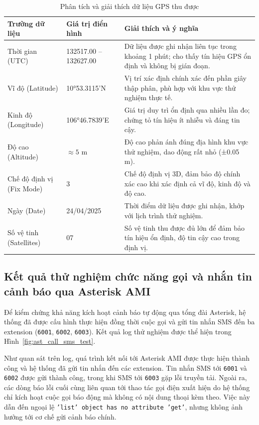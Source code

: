 \begin{table}[H]
\centering
\caption{Phân tích và giải thích dữ liệu GPS thu được}
\label{tab:gps_analysis}
\renewcommand{\arraystretch}{1.3}
\begin{tabularx}{\textwidth}{|p{3cm}|p{3cm}|X|}
\hline
\textbf{Trường dữ liệu} & \textbf{Giá trị điển hình} & \textbf{Giải thích và ý nghĩa} \\
\hline
Thời gian (UTC) & 132517.00 -- 132627.00 & Dữ liệu được ghi nhận liên tục trong khoảng 1 phút; cho thấy tín hiệu GPS ổn định và không bị gián đoạn. \\
\hline
Vĩ độ (Latitude) & 10°53.3115'N & Vị trí xác định chính xác đến phần giây thập phân, phù hợp với khu vực thử nghiệm thực tế. \\
\hline
Kinh độ (Longitude) & 106°46.7839'E & Giá trị duy trì ổn định qua nhiều lần đo; chứng tỏ tín hiệu ít nhiễu và đáng tin cậy. \\
\hline
Độ cao (Altitude) & $\approx 5$ m & Độ cao phản ánh đúng địa hình khu vực thử nghiệm, dao động rất nhỏ (±0.05 m). \\
\hline
Chế độ định vị (Fix Mode) & 3 & Chế độ định vị 3D, đảm bảo độ chính xác cao khi xác định cả vĩ độ, kinh độ và độ cao. \\
\hline
Ngày (Date) & 24/04/2025 & Thời điểm dữ liệu được ghi nhận, khớp với lịch trình thử nghiệm. \\
\hline
Số vệ tinh (Satellites) & 07 & Số vệ tinh thu được đủ lớn để đảm bảo tín hiệu ổn định, độ tin cậy cao trong định vị. \\
\hline
\end{tabularx}
\end{table}
\subsection{Kết quả thử nghiệm chức năng gọi và nhắn tin cảnh báo qua Asterisk AMI}
\label{subsec:ast_call_sms_test}

Để kiểm chứng khả năng kích hoạt cảnh báo tự động qua tổng đài Asterisk, hệ thống đã được cấu hình thực hiện đồng thời cuộc gọi và gửi tin nhắn SMS đến ba extension (\texttt{6001}, \texttt{6002}, \texttt{6003}). Kết quả log thử nghiệm được thể hiện trong Hình~\ref{fig:ast_call_sms_test}.

Như quan sát trên log, quá trình kết nối tới Asterisk AMI được thực hiện thành công và hệ thống đã gửi tin nhắn đến các extension. Tin nhắn SMS tới \texttt{6001} và \texttt{6002} được gửi thành công, trong khi SMS tới \texttt{6003} gặp lỗi truyền tải. Ngoài ra, các dòng báo lỗi cuối cùng liên quan tới thao tác gọi điện xuất hiện do hệ thống chỉ kích hoạt cuộc gọi báo động mà không có nội dung thoại kèm theo. Việc này dẫn đến ngoại lệ \texttt{'list' object has no attribute 'get'}, nhưng không ảnh hưởng tới cơ chế gửi cảnh báo chính.

